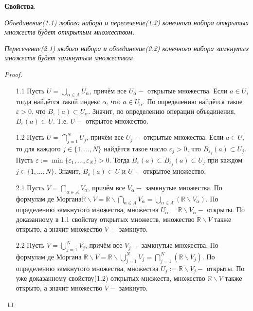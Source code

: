 \documentclass[12pt]{article}
\begin{document}
\textbf{Свойства}.

\textit{Объединение(1.1) любого набора и пересечение(1.2) конечного набора открытых множеств будет открытым множеством.}

\textit{Пересечение(2.1) любого набора и объединение(2.2) конечного набора замкнутых множеств будет замкнутым множеством.}

\begin{proof}

 

\begin{itemize}
    \item[1.1] Пусть $U = \bigcup\limits_{\alpha\in A}U_\alpha$, причём все $U_\alpha - $ открытые множества. Если $a\in U$, тогда найдётся такой индекс $\alpha$, что $a\in U_\alpha$. По определению найдётся такое $\varepsilon > 0$, что $B_\varepsilon(a) \subset U_\alpha$. Значит, по определению операции объединения, $B_\varepsilon(a)\subset U$. Т.е. $U - $ открытое множество.
    \item[1.2] Пусть $U = \bigcap\limits_{j=1}^NU_j$, причём все $U_j - $ открытые множества. Если $a\in U$, то для каждого \newline$j\in \{1,...,N\}$ найдётся такое число $\varepsilon_j>0$, что $B_{\varepsilon_j}(a) \subset U_j$. Пусть $\varepsilon := \min\{\varepsilon_1,...,\varepsilon_N\}>0$. Тогда $B_\varepsilon(a)\subset B_\varepsilon_j(a) \subset U_j$ при каждом $j \in \{1,...,N\}$. Значит, $B_\varepsilon(a) \subset U$ и $U - $ открытое множество.
    \item[2.1] Пусть $V = \bigcap\limits_{\alpha\in A}V_\alpha$, причём все $V_\alpha - $ замкнутые множества. По формулам де Моргана\newline $\mathbb{R}\backslash V = \mathbb{R}\backslash \bigcap\limits_{\alpha\in A}V_\alpha = \bigcup\limits_{\alpha\in A}(\mathbb{R}\backslash V_\alpha)$. По определению замкнутого множества, множества $U_\alpha = \mathbb{R} \backslash V_\alpha - $ открыты. По доказанному в 1.1 свойству открытых множеств, множество $\mathbb{R}\backslash V$ также открыто, а значит множество $V - $ замкнуто.
    \item[2.2] Пусть $V = \bigcup\limits_{j=1}^NV_j$, причём все $V_j - $ замкнутые множества. По формулам де Моргана $\mathbb{R}\backslash V = \mathbb{R}\backslash\bigcup\limits_{j=1}^NV_j=\bigcap\limits_{j=1}^N(\mathbb{R}\backslash V_j).$ По определению замкнутого множества, множества $U_j := \mathbb{R}\backslash V_j - $ открыты. По уже доказанному свойству(1.2) открытых множеств, множество $\mathbb{R}\backslash V$ также открыто, а значит множество $V - $ замкнуто. 
\end{itemize}
\end{proof}
\end{document}

